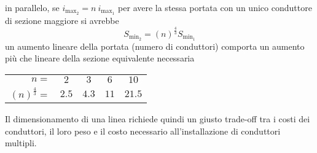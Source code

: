 in parallelo, se $i_{\text{max}_2} = n\ i_{\text{max}_1}$ per avere la stessa portata
con un unico conduttore di sezione maggiore si avrebbe
$$
S_{\text{min}_2} = (n)^{\frac{4}{3}} S_{\text{min}_1}
$$
un aumento lineare della portata (numero di conduttori) comporta un aumento più che lineare 
della sezione equivalente necessaria
\begin{center}
\begin{tabular}{r c c c c}\centering
$n =$ & $2$ & $3$ & $6$ & $10$\\
$(n)^{\frac{4}{3}} =$ & $2.5$ & $4.3$ & $11$ & $21.5$
\end{tabular}
\end{center}
Il dimensionamento di una linea richiede quindi un giusto trade-off tra i costi dei
conduttori, il loro peso e il costo necessario all'installazione di conduttori multipli.

